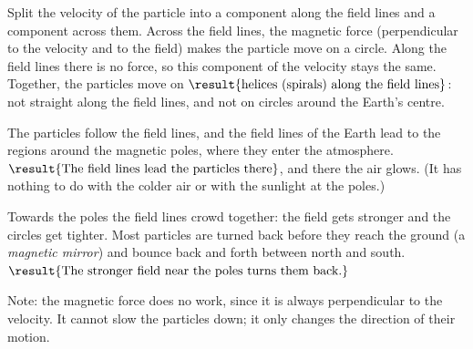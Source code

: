 \begin{abcliste}
\abc Split the velocity of the particle into a component along the field lines and a component across them. Across the field lines, the magnetic force (perpendicular to the velocity and to the field) makes the particle move on a circle. Along the field lines there is no force, so this component of the velocity stays the same. Together, the particles move on $\result{\text{helices (spirals) along the field lines}}$: not straight along the field lines, and not on circles around the Earth's centre.

\abc The particles follow the field lines, and the field lines of the Earth lead to the regions around the magnetic poles, where they enter the atmosphere. $\result{\text{The field lines lead the particles there}}$, and there the air glows. (It has nothing to do with the colder air or with the sunlight at the poles.)

\abc Towards the poles the field lines crowd together: the field gets stronger and the circles get tighter. Most particles are turned back before they reach the ground (a \emph{magnetic mirror}) and bounce back and forth between north and south. $\result{\text{The stronger field near the poles turns them back.}}$

Note: the magnetic force does no work, since it is always perpendicular to the velocity. It cannot slow the particles down; it only changes the direction of their motion.
\end{abcliste}
